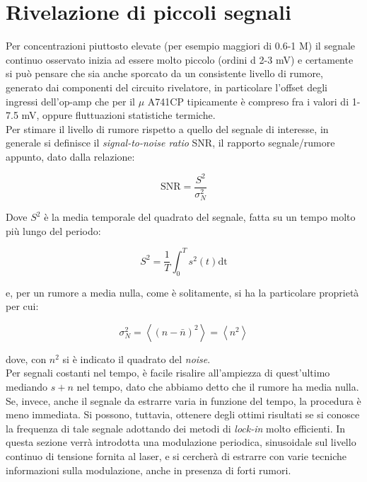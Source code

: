 \documentclass[10pt,letterpaper]{article}
\begin{document}
\section{Rivelazione di piccoli segnali}
Per concentrazioni piuttosto elevate (per esempio maggiori di 0.6-1 M) il segnale continuo osservato inizia ad essere molto piccolo (ordini d 2-3 mV) e certamente si può pensare che sia anche sporcato da un consistente livello di rumore, generato dai componenti del circuito rivelatore, in particolare l'offset degli ingressi dell'op-amp che per il \textsc{$\mu$ A741CP} tipicamente è compreso fra i valori di 1-7.5 mV, oppure fluttuazioni statistiche termiche.\\
Per stimare il livello di rumore rispetto a quello del segnale di interesse, in generale si definisce il \textit{signal-to-noise ratio} \textsc{SNR}, il rapporto segnale/rumore appunto, dato dalla relazione:

\begin{equation}
\mathrm{SNR} = \frac{S^2}{\sigma_N^2} 
\end{equation}

Dove $S^2$ è la media temporale del quadrato del segnale, fatta su un tempo molto più lungo del periodo:

\begin{equation}
S^2 = \frac{1}{T} \int_{0}^{T}s^2(t)\mathrm{dt}
\end{equation}

e, per un rumore a media nulla, come è solitamente, si ha la particolare proprietà per cui:

\begin{equation}
\sigma_N^2  = \left< (n - \bar{n})^2 \right> = \left< n^2 \right>
\end{equation}

dove, con $n^2$ si è indicato il quadrato del \textit{noise}.\\
Per segnali costanti nel tempo, è facile risalire all'ampiezza di quest'ultimo mediando $s+n$ nel tempo, dato che abbiamo detto che il rumore ha media nulla. Se, invece, anche il segnale da estrarre varia in funzione del tempo, la procedura è meno immediata. Si possono, tuttavia, ottenere degli ottimi risultati se si conosce la frequenza di tale segnale adottando dei metodi di \textit{lock-in} molto efficienti. In questa sezione verrà introdotta una modulazione periodica, sinusoidale sul livello continuo di tensione fornita al laser, e si cercherà di estrarre con varie tecniche informazioni sulla modulazione, anche in presenza di forti rumori.
\end{document}
